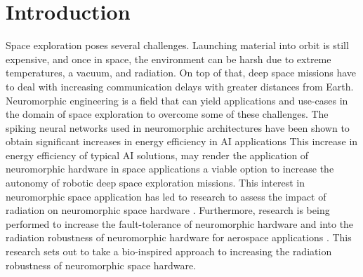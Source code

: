\section{Introduction}\label{sec:introduction}
Space exploration poses several challenges. Launching material into orbit is still expensive, and once in space, the environment can be harsh due to extreme temperatures, a vacuum, and radiation. On top of that, deep space missions have to deal with increasing communication delays with greater distances from Earth. Neuromorphic engineering is a field that can yield applications and use-cases in the domain of space exploration to overcome some of these challenges. The spiking neural networks used in neuromorphic architectures have been shown to obtain significant increases in energy efficiency in AI applications \cite{}\cite{}%
This increase in energy efficiency of typical AI solutions, may render the application of neuromorphic hardware in space applications a viable option to increase the autonomy of robotic deep space exploration missions. 
This interest in neuromorphic space application has led to research to assess the impact of radiation on neuromorphic space hardware \cite{cantley_impact_2021,roffe_neutron-induced_2021}. Furthermore, research is being performed to increase the fault-tolerance of neuromorphic hardware \cite{tran_design_2011} and into the radiation robustness of neuromorphic hardware for aerospace applications \cite{vaz_cmos_2020}. This research sets out to take a bio-inspired approach to increasing the radiation robustness of neuromorphic space hardware.

